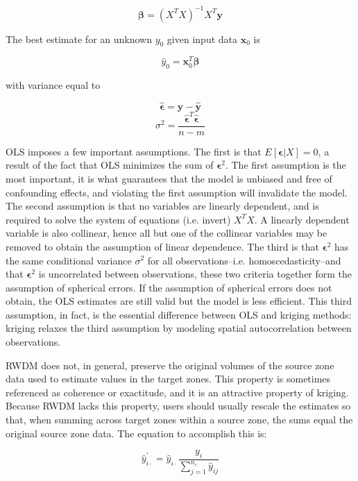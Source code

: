 \documentclass[]{interact}
\theoremstyle{plain}%
\theoremstyle{definition}
\theoremstyle{remark}
\begin{document}
\begin{equation} \label{eq:ols}
  \bm{\beta} = (X^T X)^{-1} X^T \bm{y}
\end{equation}

The best estimate for an unknown $y_0$ given input data $\bm{x}_0$ is

\[\hat{y}_0 = \bm{x}_{0}^T \bm{\beta}\]

with variance equal to

\[\hat{\bm{\epsilon}}=\bm{y}-\bm{\hat{y}}\]
\[\sigma^2=\frac{\hat{\bm{\epsilon}}^T\hat{\bm{\epsilon}}}{n-m}\]

OLS imposes a few important assumptions.  The first is that $E[\bm{\epsilon} | X] = 0$, a result of the fact that OLS minimizes the sum of $\bm{\epsilon}^2$.  The first assumption is the most important, it is what guarantees that the model is unbiased and free of confounding effects, and violating the first assumption will invalidate the model.  The second assumption is that no variables are linearly dependent, and is required to solve the system of equations (i.e. invert) $X^TX$.  A linearly dependent variable is also collinear, hence all but one of the collinear variables may be removed to obtain the assumption of linear dependence.  The third is that $\bm{\epsilon}^2$ has the same conditional variance $\sigma^2$ for all observations--i.e. homoscedasticity--and that $\bm{\epsilon}^2$ is uncorrelated between observations, these two criteria together form the assumption of spherical errors.  If the assumption of spherical errors does not obtain, the OLS estimates are still valid but the model is less efficient.  This third assumption, in fact, is the essential difference between OLS and kriging methods: kriging relaxes the third assumption by modeling spatial autocorrelation between observations.

RWDM does not, in general, preserve the original volumes of the source zone data used to estimate values in the target zones.  This property is sometimes referenced as coherence or exactitude, and it is an attractive property of kriging.  Because RWDM lacks this property, users should usually rescale the estimates so that, when summing across target zones within a source zone, the sums equal the original source zone data.  The equation to accomplish this is:

\[\hat{y}^{'}_{i\cdot} = \hat{y}_{i\cdot} \frac{y_i}{\sum_{j=1}^{n_i} \hat{y}_{ij}}\]
\end{document}
